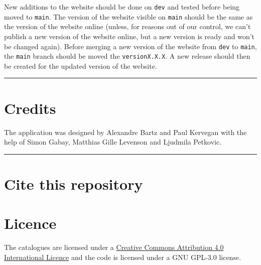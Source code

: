 New additions to the website should be done on \texttt{dev} and tested before being moved to \texttt{main}.
The version of the website visible on \texttt{main} should be the same as the version of the website
online (unless, for reasons out of our control, we can't publish a new version of the website
online, but a new version is ready and won't be changed again). Before merging a new version
of the website from \texttt{dev} to \texttt{main}, the \texttt{main} branch should be moved the \texttt{versionX.X.X}.
A new release should then be created for the updated version of the website.

\par\noindent\rule{\linewidth}{0.4pt}
\section*{Credits}

The application was designed by Alexandre Bartz and Paul Kervegan with the help of Simon Gabay, Matthias Gille Levenson and Ljudmila Petkovic.

\par\noindent\rule{\linewidth}{0.4pt}
\section*{Cite this repository}

\section*{Licence}

The catalogues are licensed under a \href{http://creativecommons.org/licenses/by/4.0/}{Creative Commons Attribution 4.0 International Licence} and the code is licensed under a GNU GPL-3.0 license.
